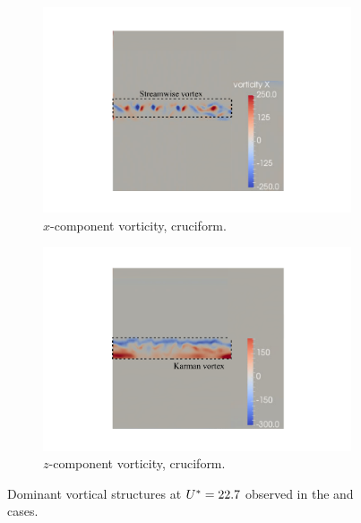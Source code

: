 \documentclass[oneside]{utmthesis}
\begin{document}
\begin{figure} \continuedfloat
  \centering
  \begin{subfigure}[h]{1\textwidth}
    \centering
    \includegraphics[width=\textwidth]{figs/vorx00}
    \caption{$x$-component vorticity, \angth{} cruciform.}
    \label{fig:vorx00}
  \end{subfigure}

  \begin{subfigure}[h]{1\textwidth}
    \centering
    \includegraphics[width=\textwidth]{figs/vorz00}
    \caption{$z$-component vorticity, \angth{} cruciform.}
    \label{fig:vorz00}
  \end{subfigure}

  \caption{Dominant vortical structures at $U^{*} = 22.7$ observed in the \angtw{} and \angon{} cases.} \label{fig:vortStruct22500}
\end{figure}
\end{document}
